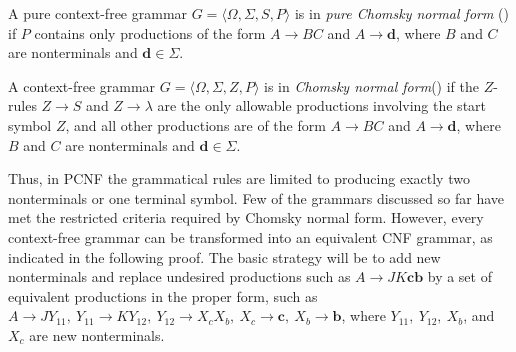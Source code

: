 \begin{dfn}\label{dfn-9.9}
A pure context-free grammar $G=\langle\Omega,\Sigma,S,P\rangle$ is in
\emph{pure Chomsky normal form} () if $P$ contains only
productions of the form $A\rightarrow BC$ and $A\rightarrow\pmb{d}$, where $B$
and $C$ are nonterminals and $\pmb{d}\in\Sigma$.

A context-free grammar $G=\langle\Omega,\Sigma,Z,P\rangle$ is in
\emph{Chomsky normal form}() if the $Z$-rules $Z\rightarrow
S$ and $Z\rightarrow\lambda$ are the only allowable productions involving the
start symbol $Z$, and all other productions are of the form $A\rightarrow BC$
and $A\rightarrow\pmb{d}$, where $B$ and $C$ are nonterminals and $\pmb{d}\in
\Sigma$.
\end{dfn}

Thus, in PCNF the grammatical rules are limited to producing exactly two
nonterminals or one terminal symbol. Few of the grammars discussed so far have
met the restricted criteria required by Chomsky normal form. However, every
context-free grammar can be transformed into an equivalent CNF grammar, as
indicated in the following proof. The basic strategy will be to add new
nonterminals and replace undesired productions such as $A\rightarrow JK\pmb{cb}$
by a set of equivalent productions in the proper form, such as $A\rightarrow
JY_{11},\ Y_{11}\rightarrow KY_{12},\ Y_{12}\rightarrow X_cX_b,\ X_c\rightarrow
\pmb{c},\ X_b\rightarrow\pmb{b}$, where $Y_{11},\ Y_{12},\ X_b$, and $X_c$ are
new nonterminals.

